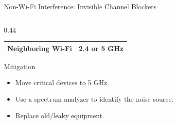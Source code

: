 \documentclass[aspectratio=169]{beamer}
\begin{document}
\begin{frame}{Non-Wi-Fi Interference: Invisible Channel Blockers}
\begin{columns}[T]
\begin{column}{0.44\textwidth}
\begin{table}[]
\begin{tabular}{|l|l|}
                Neighboring Wi-Fi & 2.4 or 5 GHz \\ \hline
                \end{tabular}
            \end{table}
            \vspace{0.2em}
            \begin{block}{Mitigation}
                \footnotesize
                \begin{itemize}
                    \item Move critical devices to 5 GHz.
                    \item Use a spectrum analyzer to identify the noise source.
                    \item Replace old/leaky equipment.
                \end{itemize}
            \end{block}
        \end{column}
    \end{columns}
\end{frame}
\end{document}
